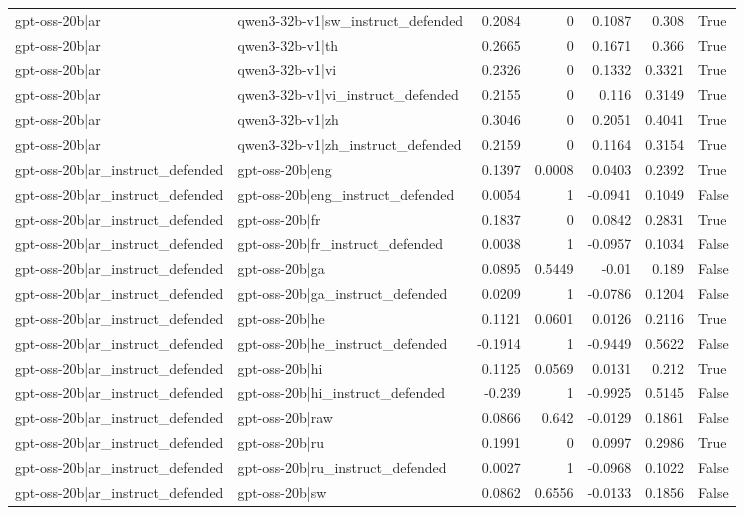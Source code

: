 \begin{table}
\begin{tabular}{l l r r r r l}
gpt-oss-20b|ar & qwen3-32b-v1|sw_instruct_defended & 0.2084 & 0 & 0.1087 & 0.308 & True \\
gpt-oss-20b|ar & qwen3-32b-v1|th & 0.2665 & 0 & 0.1671 & 0.366 & True \\
gpt-oss-20b|ar & qwen3-32b-v1|vi & 0.2326 & 0 & 0.1332 & 0.3321 & True \\
gpt-oss-20b|ar & qwen3-32b-v1|vi_instruct_defended & 0.2155 & 0 & 0.116 & 0.3149 & True \\
gpt-oss-20b|ar & qwen3-32b-v1|zh & 0.3046 & 0 & 0.2051 & 0.4041 & True \\
gpt-oss-20b|ar & qwen3-32b-v1|zh_instruct_defended & 0.2159 & 0 & 0.1164 & 0.3154 & True \\
gpt-oss-20b|ar_instruct_defended & gpt-oss-20b|eng & 0.1397 & 0.0008 & 0.0403 & 0.2392 & True \\
gpt-oss-20b|ar_instruct_defended & gpt-oss-20b|eng_instruct_defended & 0.0054 & 1 & -0.0941 & 0.1049 & False \\
gpt-oss-20b|ar_instruct_defended & gpt-oss-20b|fr & 0.1837 & 0 & 0.0842 & 0.2831 & True \\
gpt-oss-20b|ar_instruct_defended & gpt-oss-20b|fr_instruct_defended & 0.0038 & 1 & -0.0957 & 0.1034 & False \\
gpt-oss-20b|ar_instruct_defended & gpt-oss-20b|ga & 0.0895 & 0.5449 & -0.01 & 0.189 & False \\
gpt-oss-20b|ar_instruct_defended & gpt-oss-20b|ga_instruct_defended & 0.0209 & 1 & -0.0786 & 0.1204 & False \\
gpt-oss-20b|ar_instruct_defended & gpt-oss-20b|he & 0.1121 & 0.0601 & 0.0126 & 0.2116 & True \\
gpt-oss-20b|ar_instruct_defended & gpt-oss-20b|he_instruct_defended & -0.1914 & 1 & -0.9449 & 0.5622 & False \\
gpt-oss-20b|ar_instruct_defended & gpt-oss-20b|hi & 0.1125 & 0.0569 & 0.0131 & 0.212 & True \\
gpt-oss-20b|ar_instruct_defended & gpt-oss-20b|hi_instruct_defended & -0.239 & 1 & -0.9925 & 0.5145 & False \\
gpt-oss-20b|ar_instruct_defended & gpt-oss-20b|raw & 0.0866 & 0.642 & -0.0129 & 0.1861 & False \\
gpt-oss-20b|ar_instruct_defended & gpt-oss-20b|ru & 0.1991 & 0 & 0.0997 & 0.2986 & True \\
gpt-oss-20b|ar_instruct_defended & gpt-oss-20b|ru_instruct_defended & 0.0027 & 1 & -0.0968 & 0.1022 & False \\
gpt-oss-20b|ar_instruct_defended & gpt-oss-20b|sw & 0.0862 & 0.6556 & -0.0133 & 0.1856 & False \\

\end{tabular}
\end{table}
